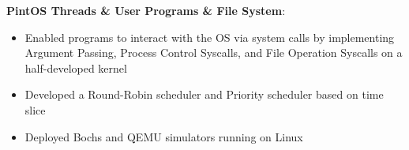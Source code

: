 \documentclass[letterpaper,11pt]{article}
\newcommand{\resumeItem}[2]{
  \item\small{
    \textbf{#1}{: #2 \vspace{-2pt}}
  }
}
\newcommand{\resumeSubItem}[2]{\resumeItem{#1}{#2}\vspace{-4pt}}
\begin{document}
\resumeItem
       {PintOS Threads \& User Programs \& File System}{}
       \begin{itemize}
       
       \item Enabled programs to interact with the OS via system calls by implementing Argument Passing, Process Control Syscalls, and File Operation Syscalls on a half-developed kernel
       \item Developed a Round-Robin scheduler and Priority scheduler based on time slice
       \item Deployed Bochs and QEMU simulators running on Linux
       \end{itemize}
  
  
        
      
\end{document}
